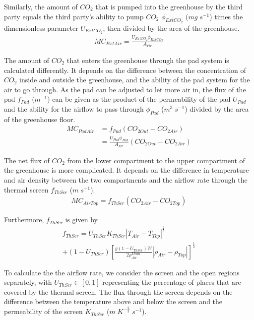 \documentclass[a4paper]{article}
\begin{document}
Similarly, the amount of \(CO_2\) that is pumped into the greenhouse by the third party equals the third party's ability to pump \(CO_2\) \(\phi_{ExtCO_2}\) (\(mg\;s^{-1}\)) times the dimensionless parameter \(U_{ExtCO_2}\), then divided by the area of the greenhouse.
\begin{align}
  MC_{ExtAir} = \frac{U_{ExtCO_2}\phi_{ExtCO_2}}{A_{Flr}}
\end{align}

The amount of \(CO_2\) that enters the greenhouse through the pad system is calculated differently.
It depends on the difference between the concentration of \(CO_2\) inside and outside the greenhouse, and the ability of the pad system for the air to go through.
As the pad can be adjusted to let more air in, the flux of the pad \(f_{Pad}\) (\(m^{-1}\)) can be given as the product of the permeability of the pad \(U_{Pad}\) and the ability for the airflow to pass through \(\phi_{Pad}\) (\(m^3\;s^{-1}\)) divided by the area of the greenhouse floor.
\begin{equation}
  \begin{split}
    MC_{PadAir} & = f_{Pad} (CO_{2 Out} - CO_{2 Air}) \\
    & = \frac{U_{Pad} \phi_{Pad}}{A_{Flr}} (CO_{2 Out} - CO_{2 Air})
  \end{split}
\end{equation}

The net flux of \(CO_2\) from the lower compartment to the upper compartment of the greenhouse is more complicated.
It depends on the difference in temperature and air density between the two compartments and the airflow rate through the thermal screen \(f_{ThScr}\) (\(m\;s^{-1}\)).
\begin{align}
  MC_{AirTop} = f_{ThScr} (CO_{2 Air} - CO_{2 Top})
\end{align}

Furthermore, \(f_{ThScr}\) is given by
\begin{multline}
  f_{ThScr} = U_{ThScr} K_{ThScr} |T_{Air} - T_{Top}|^{\frac{2}{3}} \\
  + (1 - U_{ThScr}) {\left[\frac{g(1 - U_{ThScr})W}{2\rho^{Mean}_{Air}} |\rho_{Air} - \rho_{Top}|\right]}^{\frac{1}{2}}
\end{multline}

To calculate the the airflow rate, we consider the screen and the open regions separately, with \(U_{ThScr} \in [0,1]\) representing the percentage of places that are covered by the thermal screen. The flux through the screen depends on the difference between the temperature above and below the screen and the permeability of the screen \(K_{ThScr}\) (\(m\;K^{-\frac{2}{3}}\;s^{-1}\)).
\end{document}
